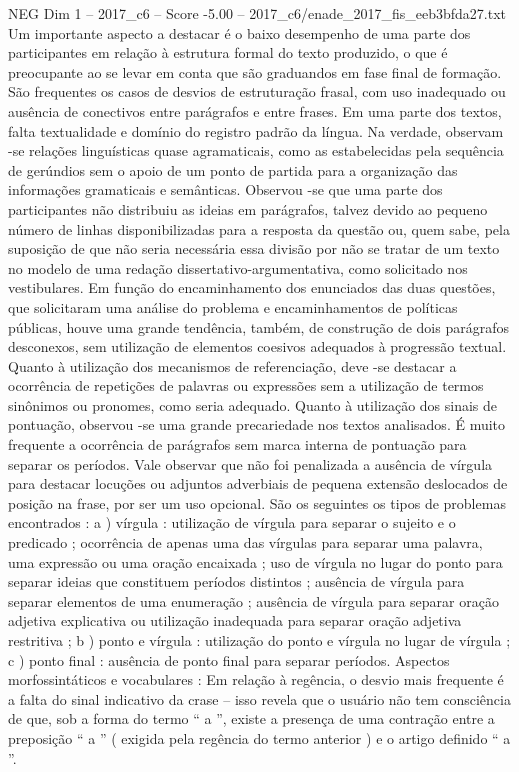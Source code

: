 \begin{textsample}{NEG Dim 1 – 2017\_c6 – Score -5.00 – 2017\_c6/enade\_2017\_fis\_eeb3bfda27.txt}
Um importante aspecto a destacar é o baixo desempenho de uma parte dos participantes em relação à estrutura formal do texto produzido, o que é preocupante ao se levar em conta que são graduandos em fase final de formação.
São frequentes os casos de desvios de estruturação frasal, com uso inadequado ou ausência de conectivos entre parágrafos e entre frases.
Em uma parte dos textos, falta textualidade e domínio do registro padrão da língua.
Na verdade, observam -se relações linguísticas quase agramaticais, como as estabelecidas pela sequência de gerúndios sem o apoio de um ponto de partida para a organização das informações gramaticais e semânticas.
Observou -se que uma parte dos participantes não distribuiu as ideias em parágrafos, talvez devido ao pequeno número de linhas disponibilizadas para a resposta da questão ou, quem sabe, pela suposição de que não seria necessária essa divisão por não se tratar de um texto no modelo de uma redação dissertativo-argumentativa, como solicitado nos vestibulares.
Em função do encaminhamento dos enunciados das duas questões, que solicitaram uma análise do problema e encaminhamentos de políticas públicas, houve uma grande tendência, também, de construção de dois parágrafos desconexos, sem utilização de elementos coesivos adequados à progressão textual.
Quanto à utilização dos mecanismos de referenciação, deve -se destacar a ocorrência de repetições de palavras ou expressões sem a utilização de termos sinônimos ou pronomes, como seria adequado.
Quanto à utilização dos sinais de pontuação, observou -se uma grande precariedade nos textos analisados.
É muito frequente a ocorrência de parágrafos sem marca interna de pontuação para separar os períodos.
Vale observar que não foi penalizada a ausência de vírgula para destacar locuções ou adjuntos adverbiais de pequena extensão deslocados de posição na frase, por ser um uso opcional.
São os seguintes os tipos de problemas encontrados : a ) vírgula : utilização de vírgula para separar o sujeito e o predicado ; ocorrência de apenas uma das vírgulas para separar uma palavra, uma expressão ou uma oração encaixada ; uso de vírgula no lugar do ponto para separar ideias que constituem períodos distintos ; ausência de vírgula para separar elementos de uma enumeração ; ausência de vírgula para separar oração adjetiva explicativa ou utilização inadequada para separar oração adjetiva restritiva ; b ) ponto e vírgula : utilização do ponto e vírgula no lugar de vírgula ; c ) ponto final : ausência de ponto final para separar períodos.
Aspectos morfossintáticos e vocabulares : Em relação à regência, o desvio mais frequente é a falta do sinal indicativo da crase – isso revela que o usuário não tem consciência de que, sob a forma do termo “ a ”, existe a presença de uma contração entre a preposição “ a ” ( exigida pela regência do termo anterior ) e o artigo definido “ a ”.

\end{textsample}
